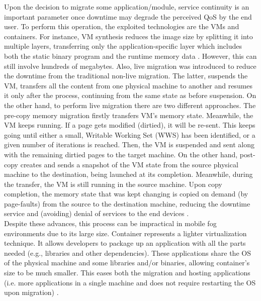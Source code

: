 Upon the decision to migrate some application/module, service continuity is an important parameter once downtime may degrade the perceived QoS by the end user. To perform this operation, the exploited technologies are the VMs and containers. For instance, VM synthesis reduces the image size by splitting it into multiple layers, transferring only the application-specific layer which includes both the static binary program and the runtime memory data \cite{ma2017efficient}. However, this can still involve hundreds of megabytes. Also, live migration was introduced to reduce the downtime from the traditional non-live migration. The latter, suspends the VM, transfers all the content from one physical machine to another and resumes it only after the process, continuing from the same state as before suspension. On the other hand, to perform live migration there are two different approaches. The pre-copy memory migration firstly transfers VM’s memory state. Meanwhile, the VM keeps running. If a page gets modified (dirtied), it will be re-sent. This keeps going until either a small, Writable Working Set (WWS) has been identified, or a given number of iterations is reached. Then, the VM is suspended and sent along with the remaining dirtied pages to the target machine. On the other hand, post-copy creates and sends a snapshot of the VM state from the source physical machine to the destination, being launched at its completion. Meanwhile, during the transfer, the VM is still running in the source machine. Upon copy completion, the memory state that was kept changing is copied on demand (by page-faults) from the source to the destination machine, reducing the downtime service and (avoiding) denial of services to the end devices \cite{hines2009post}.\\[6pt]
Despite these advances, this process can be impractical in mobile fog environments due to its large size. Container represents a lighter virtualization technique. It allows developers to package up an application with all the parts needed (e.g., libraries and other dependencies). These applications share the OS of the physical machine and some libraries and/or binaries, allowing container's size to be much smaller. This eases both the migration and hosting applications (i.e. more applications in a single machine and does not require restarting the OS upon migration) \cite{saurez2016incremental}.\\[6pt]
